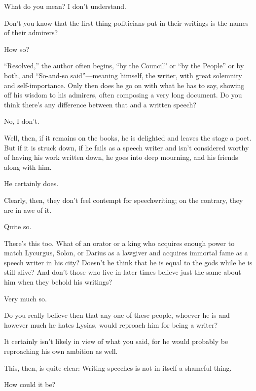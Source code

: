 \sayphaedrus What do you mean? I don't understand.

\saysocrates Don't you know that the first thing
politicians put in their
writings is the names
of their admirers?

\sayphaedrus How so?

\saysocrates “Resolved,” the author often begins, “by the Council” or “by
the People” or by both, and “So-and-so
said”---meaning
himself, the writer, with great solemnity and self-importance. Only then
does he go on with what he has to say, showing off his wisdom to his
admirers, often composing a very long document. Do you think there's any
difference between that and a written speech?

\sayphaedrus No, I don't.

\saysocrates Well, then, if it remains on the books, he is delighted and
leaves the stage a poet. But if it is struck down, if he fails as a
speech writer and isn't considered worthy of having his work written
down, he goes into deep mourning, and his friends along with him.

\sayphaedrus He certainly does.

\saysocrates Clearly, then, they don't feel contempt for speechwriting; on
the contrary, they are in awe of it.

\sayphaedrus Quite so.

\saysocrates There's this too. What of an orator or a king who acquires 
enough power to match Lycurgus, Solon, or Darius as a
lawgiver and acquires
immortal fame as a speech writer in his city? Doesn't he think that he
is equal to the gods while he is still alive? And don't those who live
in later times believe just the same about him when they behold his
writings?

\sayphaedrus Very much so.

\saysocrates Do you really believe then that any one of these people,
whoever he is and however much he hates Lysias, would reproach him for
being a writer?

\sayphaedrus It certainly isn't likely in view of what you said, for he
would probably be reproaching his own ambition as well.

\saysocrates This, then, is quite clear: Writing speeches is not in itself
a shameful thing.

\sayphaedrus How could it be?


